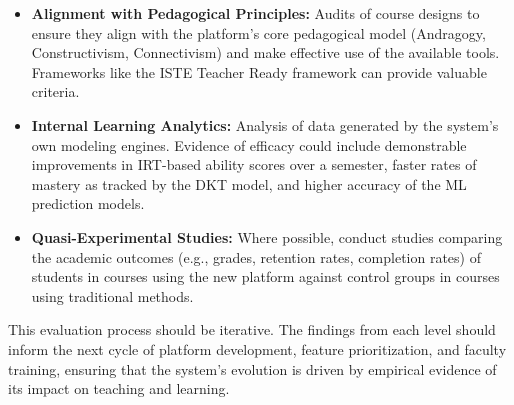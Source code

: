 \documentclass{article}
\begin{document}
\begin{enumerate}
\begin{itemize}
        \item \textbf{Alignment with Pedagogical Principles:} Audits of course designs to ensure they align with the platform's core pedagogical model (Andragogy, Constructivism, Connectivism) and make effective use of the available tools.\cite{112, 113} Frameworks like the ISTE Teacher Ready framework can provide valuable criteria.\cite{115}
        \item \textbf{Internal Learning Analytics:} Analysis of data generated by the system's own modeling engines. Evidence of efficacy could include demonstrable improvements in IRT-based ability scores over a semester, faster rates of mastery as tracked by the DKT model, and higher accuracy of the ML prediction models.
        \item \textbf{Quasi-Experimental Studies:} Where possible, conduct studies comparing the academic outcomes (e.g., grades, retention rates, completion rates) of students in courses using the new platform against control groups in courses using traditional methods.
    \end{itemize}
\end{enumerate}

This evaluation process should be iterative. The findings from each level should inform the next cycle of platform development, feature prioritization, and faculty training, ensuring that the system's evolution is driven by empirical evidence of its impact on teaching and learning.
\end{document}
